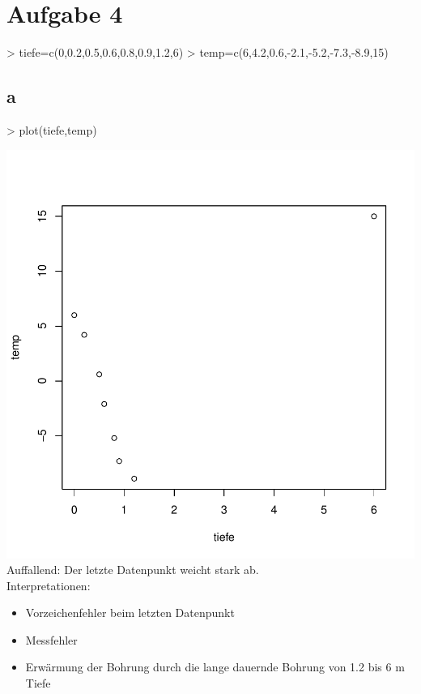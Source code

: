 

\section{Aufgabe 4}
\begin{Schunk}
\begin{Sinput}
> tiefe=c(0,0.2,0.5,0.6,0.8,0.9,1.2,6)
> temp=c(6,4.2,0.6,-2.1,-5.2,-7.3,-8.9,15)
\end{Sinput}
\end{Schunk}

\subsection{a}
\begin{Schunk}
\begin{Sinput}
> plot(tiefe,temp)
\end{Sinput}
\end{Schunk}
\includegraphics{sw11_4-002}
Auffallend: Der letzte Datenpunkt weicht stark ab. \\
Interpretationen: 
\begin{itemize}
  \item Vorzeichenfehler beim letzten Datenpunkt
  \item Messfehler
  \item Erwärmung der Bohrung durch die lange dauernde Bohrung von 1.2 bis 6 m 
  Tiefe
\end{itemize}

